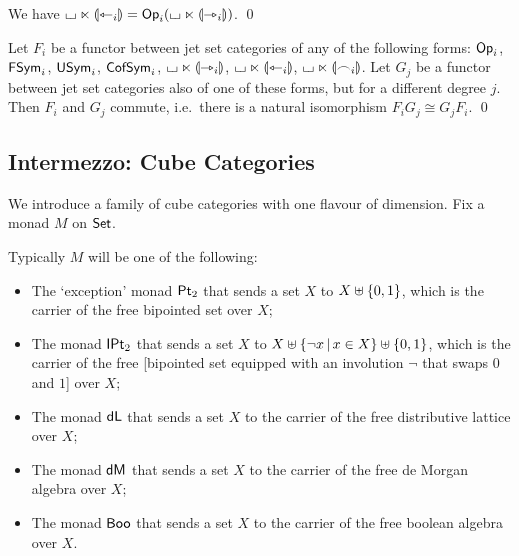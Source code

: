 \documentclass[a4paper]{article}
\begin{document}
\begin{corollary} \label{thm:twisted-prism-op}
	We have ${\llcorner\hspace{-.4ex}\lrcorner} \ltimes {\llparenthesis \leftarrowtriangle_i \rrparenthesis} = {\mathsf{Op}}_i({\llcorner\hspace{-.4ex}\lrcorner} \ltimes {\llparenthesis \rightarrowtriangle_i \rrparenthesis})$. \qed
\end{corollary}
\begin{corollary} \label{thm:commute}
	Let $F_i$ be a functor between jet set categories of any of the following forms: ${\mathsf{Op}}_i$, $\mathsf{FSym}_i$, $\mathsf{USym}_i$, $\mathsf{CofSym}_i$, ${\llcorner\hspace{-.4ex}\lrcorner} \ltimes {\llparenthesis \rightarrowtriangle_i \rrparenthesis}$, ${\llcorner\hspace{-.4ex}\lrcorner} \ltimes {\llparenthesis \leftarrowtriangle_i \rrparenthesis}$, ${\llcorner\hspace{-.4ex}\lrcorner} \ltimes {\llparenthesis \frown_i \rrparenthesis}$.
	Let $G_j$ be a functor between jet set categories also of one of these forms, but for a different degree $j$.
	Then $F_i$ and $G_j$ commute, i.e.\ there is a natural isomorphism $F_i G_j \cong G_j F_i$. \qed
\end{corollary}

\subsection{Intermezzo: Cube Categories} \label{sec:cubes}
We introduce a family of cube categories with one flavour of dimension. Fix a monad $M$ on ${\mathsf{Set}}$.
\begin{example} \label{ex:cube-monads}
	Typically $M$ will be one of the following:
	\begin{itemize}
		\item The `exception' monad ${\mathsf{Pt}_2}$ that sends a set $X$ to $X \uplus \mathopen{}\left\{ 0,1 \right\}\mathclose{}$, which is the carrier of the free bipointed set over $X$;
		\item The monad ${\mathsf{IPt}_2}$ that sends a set $X$ to $X \uplus \mathopen{}\left\{ \lnot x \,\middle|\, x \in X \right\}\mathclose{} \uplus \mathopen{}\left\{ 0, 1 \right\}\mathclose{}$, which is the carrier of the free [bipointed set equipped with an involution $\lnot$ that swaps $0$ and $1$] over $X$;
		\item The monad $\mathsf{dL}$ that sends a set $X$ to the carrier of the free distributive lattice over $X$;
		\item The monad $\mathsf{dM}$ that sends a set $X$ to the carrier of the free de Morgan algebra over $X$;
		\item The monad $\mathsf{Boo}$ that sends a set $X$ to the carrier of the free boolean algebra over $X$.
	\end{itemize}
\end{example}
\end{document}
